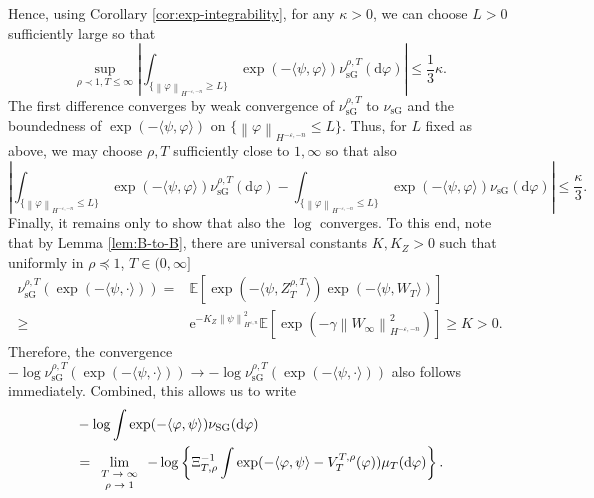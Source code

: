 \documentclass[11pt, a4paper]{scrartcl}
\numberwithin{equation}{section}
\theoremstyle{plain}
\theoremstyle{remark}
\newcommand{\mathd}{\mathrm{d}}
\newcommand{\mathe}{\mathrm{e}}
\newcommand{\tmop}[1]{\ensuremath{\operatorname{#1}}}
\newcommand{\tmscript}[1]{\text{\scriptsize{$#1$}}}
\begin{document}
Hence, using Corollary \ref{cor:exp-integrability}, for any $\kappa>0$, we can choose $L>0$ sufficiently large so that
\[
	\sup_{\rho\prec 1,T\leqslant\infty}\left|\int_{\{\left\| \varphi \right\|_{H^{-\varepsilon, -n}}\geq L \}} \exp(-\langle\psi, \varphi\rangle )\nu^{\rho,T}_{\tmop{sG}}(\mathd \varphi)\right| \leqslant \frac{1}{3} \kappa.
\]
The first difference converges by weak convergence of $\nu_{\tmop{sG}}^{\rho,T}$ to $\nu_{\tmop{sG}}$ and the boundedness of $\exp(-\langle \psi, \varphi\rangle)$ on $\{\left\| \varphi \right\|_{H^{-\varepsilon, -n}}\leqslant L \}$. Thus, for $L$ fixed as above, we may choose $\rho,T$ sufficiently close to $1,\infty$ so that also
\[
	\left|\int_{\{\left\| \varphi \right\|_{H^{-\varepsilon, -n}}\leqslant L \}}\exp(-\langle\psi, \varphi\rangle )\nu^{\rho,T}_{\tmop{sG}}(\mathd \varphi) -
	\int_{\{\left\| \varphi \right\|_{H^{-\varepsilon, -n}}\leqslant L \}} \exp(-\langle\psi, \varphi\rangle )\nu_{\tmop{sG}}(\mathd \varphi)\right| \leqslant \frac{\kappa}{3}.
\]
Finally, it remains only to show that also the $\log$ converges. To this end, note that by Lemma \ref{lem:B-to-B}, there are universal constants $K, K_Z>0$ such that uniformly in $\rho\preceq1$, $T\in (0,\infty]$
\begin{align*}
	\nu_{\tmop{sG}}^{{\rho,T}}(\exp(-\langle \psi,\cdot\rangle))
	=    & \mathbb{E} [\exp (-\langle \psi, Z_T^{{\rho,T}}\rangle) \exp(-\langle \psi, W_T \rangle) ]                                                    \\
	\geq & \mathe^{-K_{Z}\left\| \psi \right\|_{H^{\varepsilon,n}}^{2} } \mathbb{E}[\exp(-\gamma \left\| W_\infty \right\|_{H^{-\varepsilon, -n}}^{2} )]
	\geq K>0.
\end{align*}
Therefore, the convergence $-\log \nu_{\tmop{sG}}^{\rho,T}(\exp (-\langle \psi, \cdot\rangle))\to -\log \nu_{\tmop{sG}}^{\rho,T}(\exp (-\langle \psi, \cdot\rangle)) $ also follows immediately.
Combined, this allows us to write
\begin{equation*}
	\begin{aligned}
		 & - \log \int \exp (- \langle \varphi, \psi \rangle) \nu_{\tmop{SG}} (\mathd \varphi)     \\
		 & = \lim_{\tmscript{\begin{array}{c}
					                     T \rightarrow \infty \\
					                     \rho \rightarrow 1
				                     \end{array}}} - \log \left\{ \Xi_{T, \rho}^{- 1} \int \exp (- \langle
		\varphi, \psi \rangle - V_T^{T, \rho} (\varphi)) \mu_T (\mathd \varphi)
		\right\}.
	\end{aligned}
\end{equation*}
\end{document}
